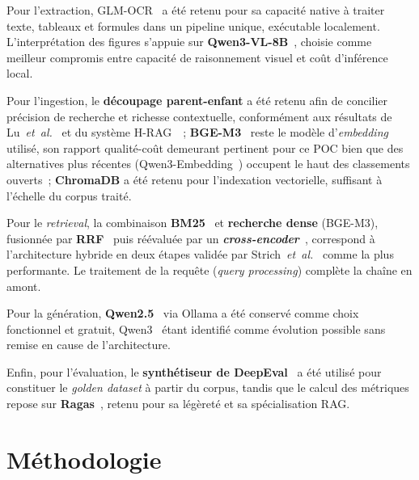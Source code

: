 \documentclass[11pt,a4paper]{article}
\begin{document}
Pour l'extraction, \textsc{GLM-OCR}~\cite{glmocr2026} a été retenu pour sa capacité native à traiter texte, tableaux et formules dans un pipeline unique, exécutable localement. L'interprétation des figures s'appuie sur \textbf{Qwen3-VL-8B}~\cite{qwen2025qwen3vl}, choisie comme meilleur compromis entre capacité de raisonnement visuel et coût d'inférence local.

Pour l'ingestion, le \textbf{découpage parent-enfant} a été retenu afin de concilier précision de recherche et richesse contextuelle, conformément aux résultats de Lu~\textit{et~al.}~\cite{lu2025hichunk} et du système H-RAG~\cite{hrag2026semeval}~; \textbf{BGE-M3}~\cite{chen2024bgem3} reste le modèle d'\textit{embedding} utilisé, son rapport qualité-coût demeurant pertinent pour ce POC bien que des alternatives plus récentes (Qwen3-Embedding~\cite{zhang2025qwen3embedding}) occupent le haut des classements ouverts~; \textbf{ChromaDB} a été retenu pour l'indexation vectorielle, suffisant à l'échelle du corpus traité.

Pour le \textit{retrieval}, la combinaison \textbf{BM25}~\cite{robertson2009bm25} et \textbf{recherche dense} (BGE-M3), fusionnée par \textbf{RRF}~\cite{cormack2009rrf} puis réévaluée par un \textbf{\textit{cross-encoder}}~\cite{nogueira2019bert,xiao2024bge}, correspond à l'architecture hybride en deux étapes validée par Strich~\textit{et~al.}~\cite{strich2026bm25} comme la plus performante. Le traitement de la requête (\textit{query processing}) complète la chaîne en amont.

Pour la génération, \textbf{Qwen2.5}~\cite{qwen2024qwen25} via Ollama a été conservé comme choix fonctionnel et gratuit, Qwen3~\cite{qwen2025qwen3} étant identifié comme évolution possible sans remise en cause de l'architecture.

Enfin, pour l'évaluation, le \textbf{synthétiseur de DeepEval}~\cite{deepeval2024} a été utilisé pour constituer le \textit{golden dataset} à partir du corpus, tandis que le calcul des métriques repose sur \textbf{Ragas}~\cite{es2024ragas}, retenu pour sa légèreté et sa spécialisation RAG.

\section{Méthodologie}
\label{sec:methodologie}
\end{document}
